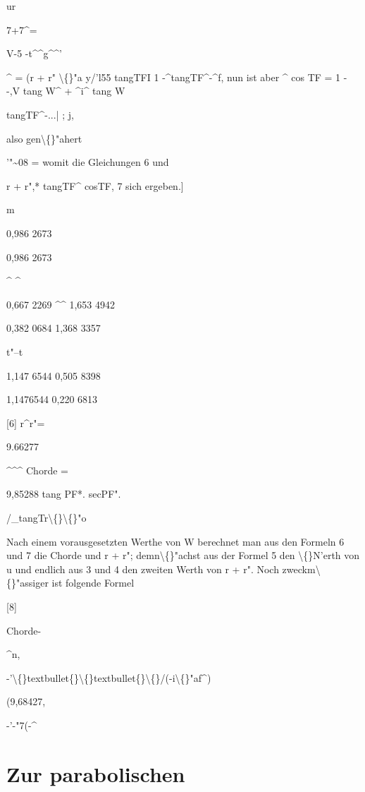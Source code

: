 \documentclass[10pt,a4paper]{article}
\begin{document}
ur

7+7\textasciicircum{}=

V-5 -t\textasciicircum{}\textasciicircum{}g\textasciicircum{}\textasciicircum{}'

\textasciicircum{}
= (r + r" \textbackslash\{\}"a y/'l55 tangTFI 1 -\textasciicircum{}tangTF\textasciicircum{}-\textasciicircum{}f,
nun ist aber
\textasciicircum{} cos TF = 1 - -,V tang W\textasciicircum{} + \textasciicircum{}i\textasciicircum{} tang W

tangTF\textasciicircum{}-...| ;
j,

also gen\textbackslash\{\}"ahert

'"\textasciitilde{}08 =
womit die Gleichungen 6 und

r + r",* tangTF\textasciicircum{} cosTF,
7 sich ergeben.]

m

0,986 2673

0,986 2673

\textasciicircum{} \textasciicircum{}

0,667 2269 \textasciicircum{}\textasciicircum{}
1,653 4942

0,382 0684
1,368 3357

t"--t

1,147 6544
0,505 8398

1,1476544
0,220 6813

[6] r\textasciicircum{}r"=

9.66277

\textasciicircum{}\textasciicircum{}\textasciicircum{} Chorde =

9,85288 tang PF*. secPF".

/\_tangTr\textbackslash\{\}\textbackslash\{\}"o

Nach einem vorausgesetzten Werthe von W berechnet man aus den Formeln 6 und 7 die Chorde und r + r"; demn\textbackslash\{\}"achst aus der Formel 5 den
\textbackslash\{\}N'erth von u und endlich aus 3 und 4 den zweiten Werth von r + r".
Noch zweckm\textbackslash\{\}"assiger ist folgende Formel

[8]

Chorde-

\textasciicircum{}n,

-'\textbackslash\{\}textbullet\{\}\textbackslash\{\}textbullet\{\}\textbackslash\{\}/(-i\textbackslash\{\}"af\textasciicircum{})

(9,68427,

-'-"7(-\textasciicircum{}

\newpage
\section*{Zur parabolischen}
\end{document}
